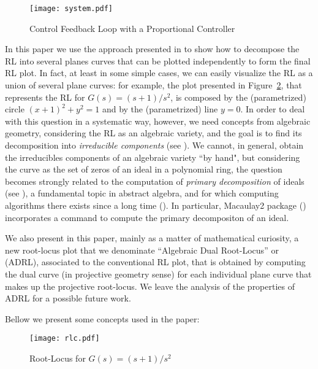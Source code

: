 \documentclass{article}
\begin{document}
\begin{figure}
\begin{center}
\texttt{[image: system.pdf]}
\caption{\label{cloop}Control Feedback Loop with a Proportional Controller}
\end{center}
\end{figure} 

In this paper we use the approach presented in \cite{pjrl} to show how to decompose the RL into several
planes curves that can be plotted independently to form the final RL plot. In fact, at least in some simple cases, 
we can easily visualize the RL as a union of several plane curves: for example, 
the plot presented in Figure~\ref{rlc}, that represents the RL for $G(s)=(s+1)/s^2$, 
is composed by the (parametrized) circle $(x+1)^2+y^2=1$ and by the (parametrized) line $y=0$. In order to deal with this 
question in a systematic way, however, we need concepts from algebraic geometry, considering
the RL as an algebraic variety, and the goal is to find its decomposition into {\em irreducible components} 
(see \cite[Chap. 4]{clo}).
We cannot, in general, obtain the irreducibles components of an algebraic variety ``by hand", 
but considering the curve as the set of zeros of an ideal in a polynomial ring, the question
becomes strongly related to the computation of {\em primary decomposition} of ideals (see \cite[Chaps. 4,7]{am}), 
a fundamental topic in abstract algebra, and for which computing algorithms there exists
since a long time (\cite{wiki}). In particular, 
Macaulay2 package (\cite{mac}) incorporates a command to
compute the primary decompositon of an ideal.

We also present in this paper, mainly as a matter of mathematical curiosity, a new root-locus plot that we denominate
``Algebraic Dual Root-Locus'' or (ADRL), associated to the conventional RL plot, that is 
obtained by computing the dual curve (in projective geometry sense) 
for each individual plane curve that makes up the 
projective root-locus. We leave the analysis of the properties of ADRL for a possible future work. 

Bellow we present some concepts used in the paper: 

\begin{figure}
\begin{center}
\texttt{[image: rlc.pdf]} 
\caption{\label{rlc} Root-Locus for $G(s)=(s+1)/s^2$} 
\end{center}
\end{figure} 
\end{document}
